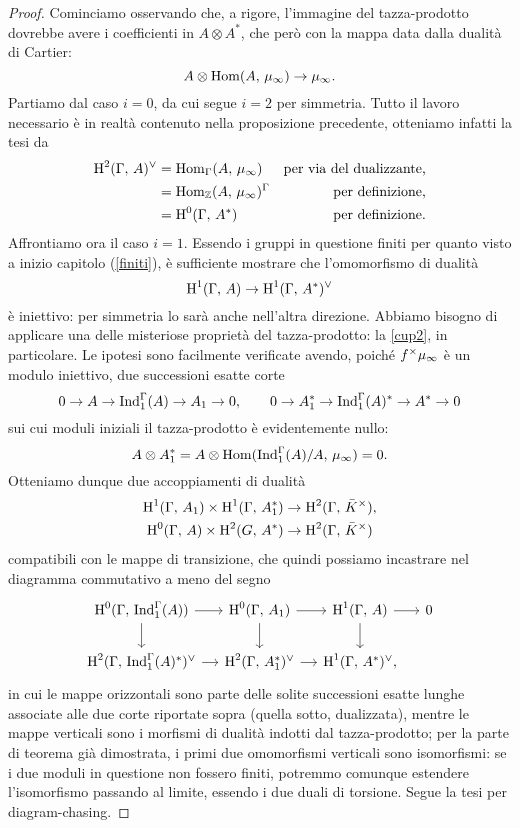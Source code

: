 
\begin{proof}
	Cominciamo osservando che, a rigore, l'immagine del tazza-prodotto dovrebbe avere i coefficienti in $ A \otimes A^* $, che però con la mappa data dalla dualità di Cartier:
	\[ A \otimes \operatorname{Hom}(A,\, \mu_\infty) \to \mu_\infty. \]
	Partiamo dal caso $ i = 0 $, da cui segue $ i = 2 $ per simmetria. Tutto il lavoro necessario è in realtà contenuto nella proposizione precedente, otteniamo infatti la tesi da
	\begin{align*}
	\operatorname{H}^2(\Gamma, \, A)^\vee & = \operatorname{Hom}_\Gamma(A, \, \mu_\infty) & \text{per via del dualizzante,} \\
	& = \operatorname{Hom}_{\mathbb{Z}}(A, \, \mu_\infty)^\Gamma & \text{per definizione,} \\
	& = \operatorname{H}^0(\Gamma, \, A^*) & \text{per definizione.}
	\end{align*}
	Affrontiamo ora il caso $ i = 1 $. Essendo i gruppi in questione finiti per quanto visto a inizio capitolo (\ref{finiti}), è sufficiente mostrare che l'omomorfismo di dualità
	\[ \operatorname{H}^1(\Gamma, \, A) \to \operatorname{H}^1(\Gamma, \, A^*)^\vee \]
	è iniettivo: per simmetria lo sarà anche nell'altra direzione. Abbiamo bisogno di applicare una delle misteriose proprietà del tazza-prodotto: la \ref{cup2}, in particolare. Le ipotesi sono facilmente verificate avendo, poiché $ f^\times\mu_\infty $ è un modulo iniettivo, due successioni esatte corte
	\[ 0 \to A \to \operatorname{Ind}_1^\Gamma(A) \to A_1 \to 0, \qquad 0 \to A_1^* \to \operatorname{Ind}_1^\Gamma(A)^* \to A^* \to 0 \]
	sui cui moduli iniziali il tazza-prodotto è evidentemente nullo:
	\[ A \otimes A_1^* = A \otimes \operatorname{Hom}(\operatorname{Ind}_1^\Gamma(A)/A, \, \mu_\infty) = 0. \]
	Otteniamo dunque due accoppiamenti di dualità 
	\begin{align*}
	\operatorname{H}^{1}(\Gamma, \, A_1) \times \operatorname{H}^{1}(\Gamma, \, A_1^*) &\to \operatorname{H}^{2}(\Gamma, \, \bar{K}^\times),\\
	\operatorname{H}^{0}(\Gamma, \, A) \times \operatorname{H}^{2}(G, \, A^*) &\to \operatorname{H}^{2}(\Gamma, \, \bar{K}^\times)
	\end{align*}
	compatibili con le mappe di transizione, che quindi possiamo incastrare nel diagramma commutativo a meno del segno
	\[\begin{tikzcd}[column sep = small]
	\HH^0(\Gamma, \, \Ind_1^\Gamma(A)) \rar\dar
	& \HH^0(\Gamma, \, A_1) \rar\dar
	& \HH^1(\Gamma, \, A) \rar\dar
	& 0 \\
	\HH^2(\Gamma, \, \Ind_1^\Gamma(A)^*)^\vee \rar
	& \HH^2(\Gamma, \, A_1^*)^\vee \rar
	& \HH^1(\Gamma, \, A^*)^\vee,
	&
	\end{tikzcd}  \]
	in cui le mappe orizzontali sono parte delle solite successioni esatte lunghe associate alle due corte riportate sopra (quella sotto, dualizzata), mentre le mappe verticali sono i morfismi di dualità indotti dal tazza-prodotto; per la parte di teorema già dimostrata, i primi due omomorfismi verticali sono isomorfismi: se i due moduli in questione non fossero finiti, potremmo comunque estendere l'isomorfismo passando al limite, essendo i due duali di torsione. Segue la tesi per diagram-chasing.
\end{proof}


